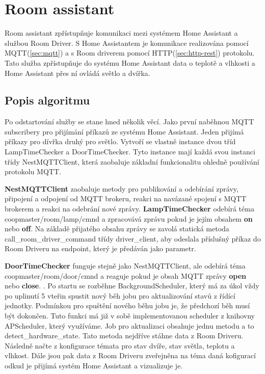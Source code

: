 \section{Room assistant}\label{sec:room-assistant}
Room assistant zpřístupňuje komunikaci mezi systémem Home Assistant a službou Room Driver.\newline
S Home Assistantem je komunikace realizována pomocí MQTT(\ref{sec:mqtt}) a s Room driverem pomocí HTTP(\ref{sec:http-rest}) protokolu.
Tato služba zpřístupňuje do systému Home Assistant data o teplotě a vlhkosti a Home Assistant přes ní ovládá světlo a dvířka.

\subsection*{Popis algoritmu}
Po odstartování služby se stane hned několik věcí.
Jako první naběhnou MQTT subscribery pro přijímání příkazů ze systému Home Assistant.
Jeden přijímá příkazy pro dívřka druhý pro světlo.
Vytvoří se vlastně instance dvou tříd LampTimeChecker a DoorTimeChecker.
Tyto instance mají každá svou instanci třídy NestMQTTClient, která zaobaluje základní funkcionalitu ohledně používání protokolu MQTT.\newline

\textbf{NestMQTTClient} zaobaluje metody pro publikování a odebírání zprávy, připojení a odpojení od MQTT brokeru, reakci na navázané spojení s MQTT brokerem a reakci na odebrání nové zprávy.\newline
\textbf{LampTimeChecker} odebírá téma coopmaster/room/lamp/cmnd a zpracovává zprávu pokud je jejím obsahem \textbf{on} nebo \textbf{off}.
Na základě přijatého obsahu zprávy se zavolá statická metoda call\_room\_driver\_command třídy driver\_client, aby odeslala příslušný příkaz do Room Driveru na endpoint, který je předáván jako parametr.

\textbf{DoorTimeChecker} funguje stejně jako NestMQTTClient, ale odebírá téma coopmaster/room/door/cmnd a reaguje pokud je obsah MQTT zprávy \textbf{open} nebo \textbf{close}.
.\newline
Po startu se rozběhne BackgroundScheduler, který má za úkol vždy po uplinutí 5 vteřin spustit nový běh jobu pro aktualizování stavů z řídící jednotky.
Podmínkou pro spuštění nového běhu jobu je, že předchozí běh musí být dokončen.
Tuto funkci má již v sobě implementovanou scheduler z knihovny APScheduler, který využíváme.
Job pro aktualizaci obsahuje jednu metodu a to detect\_hardware\_state.
Tato metoda nejdříve stáhne data z Room Driveru.
Následně načte z konfigurace témata pro stav dvíře, stav světla, teplotu a vlhkost.
Dále jsou pak data z Room Driveru zveřejněna na téma daná kofigurací odkud je přijímá systém Home Assistant a vizualizuje je.

